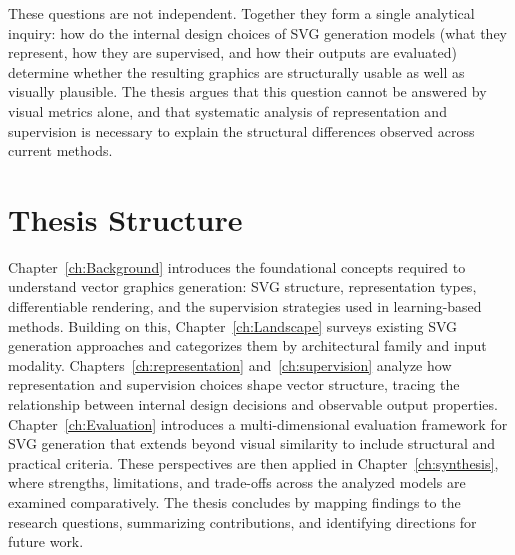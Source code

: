 These questions are not independent. Together they 
form a single analytical inquiry: how do the internal 
design choices of SVG generation models (what they 
represent, how they are supervised, and how their 
outputs are evaluated) determine whether the resulting 
graphics are structurally usable as well as visually 
plausible. The thesis argues that this question cannot 
be answered by visual metrics alone, and that 
systematic analysis of representation and supervision 
is necessary to explain the structural differences 
observed across current methods.


\section{Thesis Structure}

Chapter~\ref{ch:Background} 
introduces the foundational concepts required to understand 
vector graphics generation: SVG structure, representation 
types, differentiable rendering, and the supervision 
strategies used in learning-based methods.
Building on this, Chapter~\ref{ch:Landscape} surveys 
existing SVG generation approaches and categorizes 
them by architectural family and input modality. 
Chapters~\ref{ch:representation} and~\ref{ch:supervision} 
analyze how representation and supervision choices 
shape vector structure, tracing the relationship 
between internal design decisions and observable 
output properties.
Chapter~\ref{ch:Evaluation} introduces a 
multi-dimensional evaluation framework for SVG 
generation that extends beyond visual similarity to 
include structural and practical criteria. These 
perspectives are then applied in 
Chapter~\ref{ch:synthesis}, where strengths, 
limitations, and trade-offs across the analyzed 
models are examined comparatively.
The thesis concludes by mapping findings to the 
research questions, summarizing contributions, and 
identifying directions for future work.





